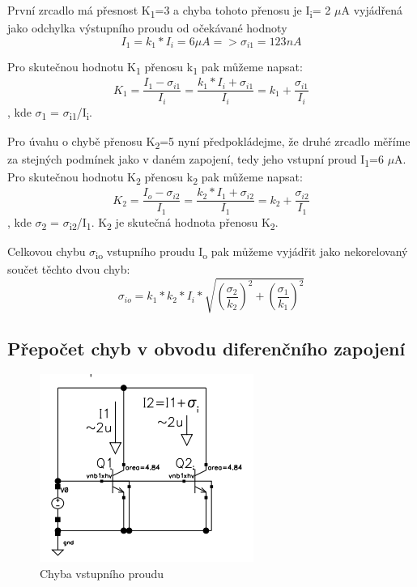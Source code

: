 První zrcadlo má přesnost K\textsubscript{1}=3 a chyba tohoto přenosu je I\textsubscript{i}= 2 $\mu$A vyjádřená jako odchylka výstupního proudu od očekávané hodnoty
\begin{equation}
I_{1}=k_{1}*I_{i}=6\mu A => \sigma_{i1}=123nA
\end{equation}

Pro skutečnou hodnotu K\textsubscript{1} přenosu k\textsubscript{1} pak můžeme napsat:
\begin{equation}
K_{1} = \frac{I_{1}-\sigma_{i1}}{I_{i}}=\frac{k_{1}*I_{i}+\sigma_{i1}}{I_{i}} = k_{1}+\frac{\sigma_{i1}}{I_{i}}
\end{equation}
, kde $\sigma$\textsubscript{1} = $\sigma$\textsubscript{i1}/I\textsubscript{i}.

Pro úvahu o chybě přenosu K\textsubscript{2}=5 nyní předpokládejme, že druhé zrcadlo měříme za stejných podmínek jako v daném zapojení, tedy jeho vstupní proud I\textsubscript{1}=6 $\mu$A. Pro skutečnou hodnotu K\textsubscript{2} přenosu k\textsubscript{2} pak můžeme napsat:
\begin{equation}
K_{2} = \frac{I_{o}-\sigma_{i2}}{I_{1}}=\frac{k_{2}*I_{1}+\sigma_{i2}}{I_{1}} = k_{2}+\frac{\sigma_{i2}}{I_{1}}
\end{equation}
, kde $\sigma$\textsubscript{2} = $\sigma$\textsubscript{i2}/I\textsubscript{1}.
K\textsubscript{2} je skutečná hodnota přenosu K\textsubscript{2}.

Celkovou chybu $\sigma$\textsubscript{io} vstupního proudu I\textsubscript{o} pak můžeme vyjádřit jako nekorelovaný součet těchto dvou chyb:
\begin{equation}
\sigma_{io}=k_{1}*k_{2}*I_{i}*\sqrt{(\frac{\sigma_{2}}{k_{2}})^2+({\frac{\sigma_{1}}{k_{1}}})^2}
\end{equation}



\subsection{Přepočet chyb v obvodu diferenčního zapojení}

\begin{figure}[h]
   \begin{center}
     \includegraphics[scale=1]{images/Prepocet.png}
   \end{center}
   \caption{Chyba vstupního proudu}
\end{figure}

